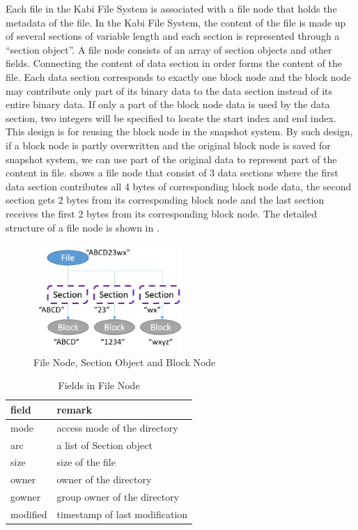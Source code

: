     Each file in the Kabi File System is associated with a file node that holds the metadata of the file. In the Kabi File System, the content of the file is made up of several sections of variable length and each section is represented through a ``section object''. A file node consists of an array of section objects and other fields. Connecting the content of data section in order forms the content of the file. Each data section corresponds to exactly one block node and the block node may contribute only part of its binary data to the data section instead of its entire binary data. If only a part of the block node data is used by the data section, two integers will be specified to locate the start index and end index. This design is for reusing the block node in the snapshot system. By such design, if a block node is partly overwritten and the original block node is saved for snapshot system, we can use part of the original data to represent part of the content in file.  shows a file node that consist of 3 data sections where the first data section contributes all 4 bytes of corresponding block node data, the second section gets 2 bytes from its corresponding block node and the last section receives the first 2 bytes from its corresponding block node. The detailed structure of a file node is shown in .

\begin{figure}[hbtp]
\centering
\includegraphics[width=0.5\textwidth]{Chapter-3/figs/fig7.png}
\caption{File Node, Section Object and Block Node}
\label{fig:file_and_section}
\end{figure}


\begin{table}
\caption{Fields in File Node}
\label{tab:file_fields}
\begin{center}
\begin{tabular}{ll}
\toprule
field & remark\\
\midrule
mode & access mode of the directory\\
arc & a list of Section object\\
size & size of the file\\
owner & owner of the directory\\
gowner & group owner of the directory\\
modified & timestamp of last modification\\
\bottomrule
\end{tabular}
\end{center}
\end{table}

